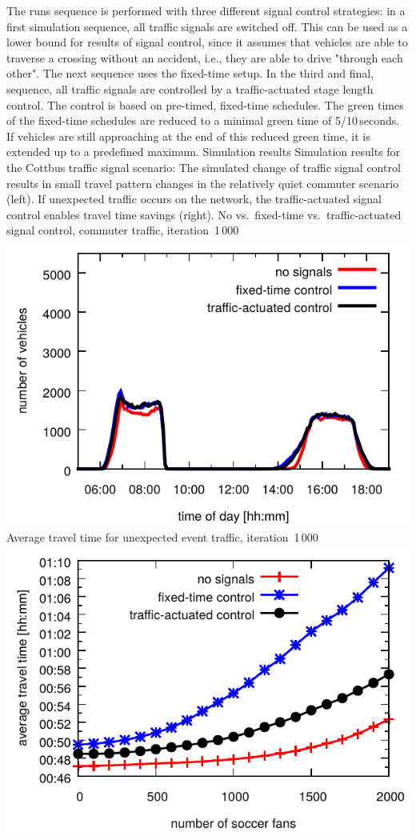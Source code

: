 The runs sequence is performed with three different signal control strategies:
in a first simulation sequence, all traffic signals are switched off. This can be used as a lower bound for results of signal control, since it assumes that vehicles are able to traverse a crossing without an accident, i.e., they are able to drive "through each other". 
The next sequence uses the fixed-time setup. 
In the third and final, sequence, all traffic signals are controlled by a traffic-actuated stage length control. 
The control is based on pre-timed, fixed-time schedules. 
The green times of the fixed-time schedules are reduced to a minimal green time of 5/10\,seconds. 
If vehicles are still approaching at the end of this reduced green time, it is extended up to a predefined maximum. 
%
\createfigure%
{Simulation results}%
{Simulation results for the Cottbus traffic signal scenario: The simulated change of traffic signal control results in small travel pattern changes in the relatively quiet commuter scenario (left). If unexpected traffic occurs on the network, the traffic-actuated signal control enables travel time savings (right).}%
{\label{fig:results_histogram}}
{%
  \createsubfigure%
  {No vs.~fixed-time vs.~traffic-actuated signal control, commuter traffic, iteration~1\,000}%
	{\includegraphics[width=0.48\linewidth]{extending/figures/signalslanes/leg_histogram_cottbus_1292_1293_1291_it_1000_book.pdf}}
  {\label{fig:commuter_traffic}}%
  \createsubfigure%
	{Average travel time for unexpected event traffic, iteration~1\,000}
	{\includegraphics[width=0.48\linewidth]{extending/figures/signalslanes/average_travel_time_1220_1222_book.pdf}}
	{\label{fig:unexpected_event}}
}%
{\citet{Grether2014PhD}}

